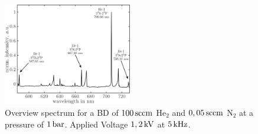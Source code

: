 \documentclass[a4paper,10pt,twoside]{article}
\begin{document}
				\begin{figure}[t]
					\centering
					\includegraphics[width=0.5\textwidth]{figures/results/int_spectrum}
					\caption{Overview spectrum for a BD of $\unit[100]{sccm}$ He$_2$ and $\unit[0,05]{sccm}$ N$_2$ at a pressure of $\unit[1]{bar}$. Applied Voltage $\unit[1,2]{kV}$ at $\unit[5]{kHz}$.}
					\label{img:intspec}
				\end{figure}
			
\end{document}
